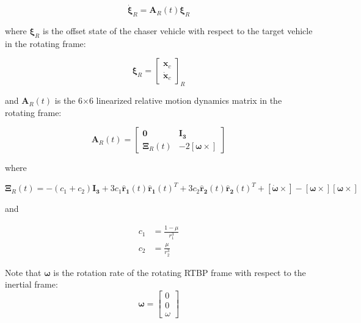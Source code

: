 \documentclass[letterpaper, preprint, paper,11pt]{AAS}	%
\begin{document}
\begin{equation} \label{eq:RelmoDerivs}
	\dot{\boldsymbol{\xi}}_R = \mathbf{A}_R(t)\boldsymbol{\xi}_R
\end{equation}

where \(\boldsymbol{\xi}_R\) is the offset state of the chaser vehicle with respect to the target vehicle in the rotating frame:

\begin{equation}  %
	\boldsymbol{\xi}_R = \begin{bmatrix}
		\mathbf{x}_c \\
		\dot{\mathbf{x}}_c
	\end{bmatrix}_R
\end{equation}

and  \(\mathbf{A}_R(t)\) is the 6\(\times\)6 linearized relative motion dynamics matrix in the rotating frame: %

\begin{equation} \label{eq:RelmoDynMatrix}
	\mathbf{A}_R(t) = \begin{bmatrix}
		\mathbf{0}          & \mathbf{I_3} \\
		\mathbf{\Xi}_R(t) & -2 [\boldsymbol{\omega} \times]
	\end{bmatrix}
\end{equation}

where

\begin{equation}
	\mathbf{\Xi}_R(t) = -(c_1 + c_2)\mathbf{I_3} 
	+ 3c_1\mathbf{\hat{r}_1}(t) \mathbf{\hat{r}_1}(t)^T 
	+ 3c_2\mathbf{\hat{r}_2}(t) \mathbf{\hat{r}_2}(t)^T 
	+ [\boldsymbol{\dot{\omega}} \times] 
	- [\boldsymbol{\omega}\times][\boldsymbol{\omega}\times]
\end{equation}

and

\begin{equation}
	\begin{aligned}
		c_1 &= \frac{1- \mu}{r_1^3} \\
		c_2 &= \frac{\mu}{r_2^3}
	\end{aligned}
\end{equation}

Note that \(\boldsymbol{\omega}\) is the rotation rate of the rotating RTBP frame with respect to the inertial frame:
\begin{equation}
	\boldsymbol{\omega} = \begin{bmatrix}
		0 \\ 
		0 \\
		\omega
	\end{bmatrix}
\end{equation}
\end{document}
